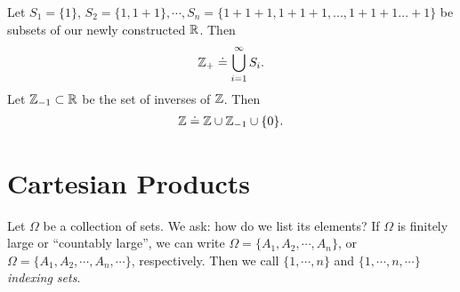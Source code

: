 \begin{definition}
Let $S_{1} = \{1\}$,
$S_{2} = \{1, 1+1\}, \cdots, S_{n} = \{1 + 1+1, 1+1+1, ..., 1+1+1...+1\}$
be subsets of our newly constructed $\mathbb{R}$. Then
\begin{equation*}
\begin{split}
\mathbb{Z}_{+} \doteq \bigcup_{i=1}^{\infty} S_{i}.
\end{split}
\end{equation*}
Let $\mathbb{Z}_{-1} \subset \mathbb{R}$ be the set of inverses of $\mathbb{Z}$. Then
\begin{equation*}
\begin{split}
	\mathbb{Z} \doteq \mathbb{Z} \cup \mathbb{Z}_{-1} \cup \{0\}.
\end{split}
\end{equation*}
\end{definition}
\begin{definition}[Induction]
\end{definition}
\section{Cartesian Products} 
Let $\Omega$ be a collection of sets. We ask: how do we list its elements?
If $\Omega$ is finitely large or ``countably large'', we can write
$\Omega = \{ A_{1}, A_{2}, \cdots, A_{n}\}$, or
$\Omega = \{ A_{1}, A_{2}, \cdots, A_{n}, \cdots\}$, respectively.
Then we call $\{ 1,\cdots, n\}$ and $\{1, \cdots, n, \cdots\}$ \emph{indexing
sets}.


